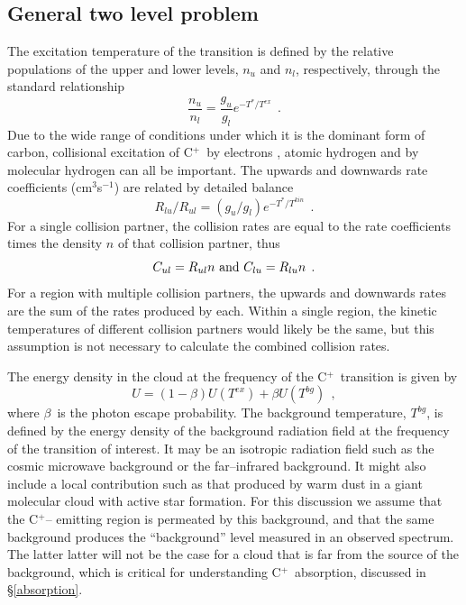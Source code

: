 \documentclass[12pt]{aastex}
\def \lp{\>\> .}
\def \lc{\>\> ,}
\def \cp{C$^+$}
\def \be{\begin{equation}}
\def \ee{   \end{equation}}
\def \lc{\>\> ,}
\def \lp{\>\> .}
\begin{document}
\subsection{General two level problem}
\label{2levelproblem}

The excitation temperature of the transition is defined by the relative populations of the upper and lower levels, $n_u$ and $n_l$, respectively, through the standard relationship
\be
\frac{n_u}{n_l}  = \frac{g_u }{g_l} e^{-T^* / T^{ex}} \lp
\label{tex}
\ee
Due to the wide range of conditions under which it is the dominant form of carbon, collisional excitation of \cp\  by electrons \citep{keenan1986, blum1991, wilson2002}, atomic hydrogen \citep{launay1977, barinovs2005} and by molecular hydrogen \citep{flower1977, flower1988, flower1990} can all be important.
The upwards and downwards rate coefficients (cm$^3$s$^{-1}$) are related by detailed balance
\be
R_{lu}/R_{ul} = (g_u / g_l) e^{-T^* / T^{kin}} \lp
\ee
For a single collision partner, the collision rates are equal to the rate coefficients times the density $n$ of that collision partner, thus  
\be
C_{ul} = R_{ul}n {\rm ~and ~} C_{lu} = R_{lu}n\lp
\ee
For a region with multiple collision partners, the upwards and downwards rates are the sum of the rates produced by each.
Within a single region, the kinetic temperatures of different collision partners would likely be the same, but this assumption is not necessary to calculate the combined collision rates.

The energy density in the cloud at  the frequency of the \cp\ transition is given by
\be
U = (1 - \beta)U(T^{ex}) + \beta U(T^{bg}) \lc
\ee
where $\beta$\ is the photon escape probability.
The background temperature, $T^{bg}$, is defined by the energy density of the background radiation field at the frequency of the transition of interest.  It may be an isotropic radiation field such as the cosmic microwave background or the far--infrared background.  
It might also include a local contribution such as that produced by warm dust in a giant molecular cloud with active star formation.  
For this discussion we assume that the \cp-- emitting region is permeated by this background, and that the same background produces the ``background'' level measured in an observed spectrum.  
The latter latter will not be the case for a cloud that is far from the source of the background, which is critical for understanding \cp\ absorption, discussed in \S \ref{absorption}.

\end{document}

